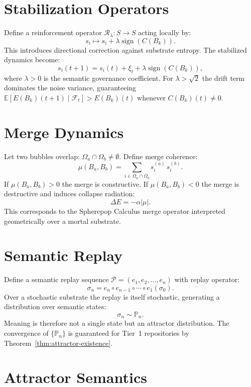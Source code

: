 \documentclass[11pt]{article}
\begin{document}
\section{Stabilization Operators}
\label{sec:stabilization}

Define a reinforcement operator $\mathcal{R}_\lambda : S \to S$ acting locally
by:
\[
s_i \mapsto s_i + \lambda \operatorname{sign}(C(B_k)).
\]
This introduces directional correction against substrate entropy. The stabilized
dynamics become:
\[
s_i(t+1) = s_i(t) + \xi_t + \lambda \operatorname{sign}(C(B_k)),
\]
where $\lambda > 0$ is the semantic governance coefficient. For $\lambda >
\sqrt{2}$ the drift term dominates the noise variance, guaranteeing
$\mathbb{E}[E(B_k)(t+1) \mid \mathcal{F}_t] > E(B_k)(t)$ whenever
$C(B_k)(t) \neq 0$.

\section{Merge Dynamics}
\label{sec:merge}

Let two bubbles overlap: $\Omega_a \cap \Omega_b \ne \emptyset$. Define merge
coherence:
\[
\mu(B_a, B_b) = \sum_{i \in \Omega_a \cap \Omega_b} s_i^{(a)}\, s_i^{(b)}.
\]
If $\mu(B_a, B_b) > 0$ the merge is constructive. If $\mu(B_a, B_b) < 0$ the
merge is destructive and induces collapse radiation:
\[
\Delta E = -\alpha |\mu|.
\]
This corresponds to the Spherepop Calculus merge operator interpreted
geometrically over a mortal substrate.

\section{Semantic Replay}
\label{sec:replay}

Define a semantic replay sequence $\mathcal{P} = (e_1, e_2, \dots, e_n)$ with
replay operator:
\[
\sigma_n = e_n \circ e_{n-1} \circ \cdots \circ e_1(\sigma_0).
\]
Over a stochastic substrate the replay is itself stochastic, generating a
distribution over semantic states:
\[
\sigma_n \sim \mathbb{P}_n.
\]
Meaning is therefore not a single state but an attractor distribution. The
convergence of $\{\mathbb{P}_n\}$ is guaranteed for Tier~1 repositories by
Theorem~\ref{thm:attractor-existence}.

\section{Attractor Semantics}
\label{sec:attractors}
\end{document}
